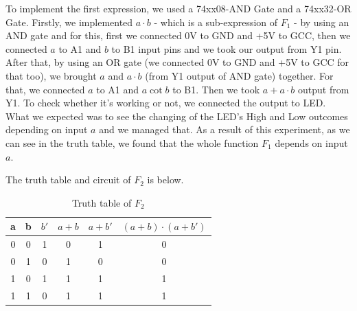 \documentclass[pdftex,12pt,a4paper]{article}
\begin{document}
To implement the first expression, we used a 74xx08-AND Gate and a 74xx32-OR Gate. Firstly, we implemented $a \cdot b$ - which is a sub-expression of $F_1$ - by using an AND gate and for this, first we connected 0V to GND and +5V to GCC, then we connected $a$ to A1 and $b$ to B1 input pins and we took our output from Y1 pin. After that, by using an OR gate (we connected 0V to GND and +5V to GCC for that too), we brought $a$ and $a \cdot b$ (from Y1 output of AND gate) together. For that, we connected $a$ to A1 and $a \cot b$ to B1. Then we took $a + a \cdot b$ output from Y1. To check whether it's working or not, we connected the output to LED. What we expected was to see the changing of the LED's High and Low outcomes depending on input $a$ and we managed that. As a result of this experiment, as we can see in the truth table, we found that the whole function $F_1$ depends on input $a$.

The truth table and circuit of $F_2$ is below.

\begin{table}[h]
    \centering
    \begin{tabular}{|c|c|c|c|c|c|}
    \hline
    a & b & $b'$ & $a + b$ & $a + b'$ & $(a + b) \cdot (a + b')$ \\ \hline
    0 & 0 & 1    & 0       & 1        & 0                  \\
    0 & 1 & 0    & 1       & 0        & 0                  \\
    1 & 0 & 1    & 1       & 1        & 1                  \\
    1 & 1 & 0    & 1       & 1        & 1                  \\ \hline
    \end{tabular}
    \caption{Truth table of $F_2$}
    \label{fig2}
\end{table}
\end{document}
